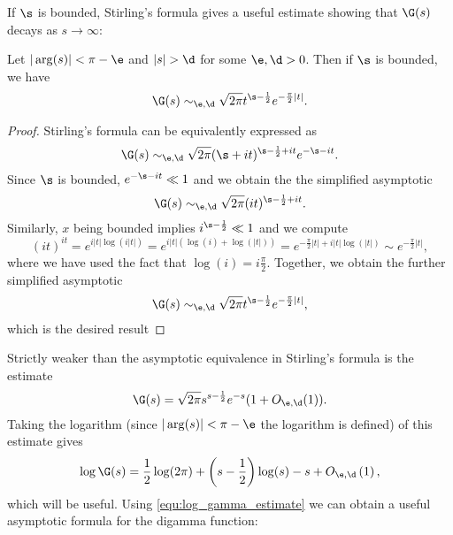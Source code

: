       If $\s$ is bounded, Stirling's formula gives a useful estimate showing that $\G(s)$ decays as $s \to \infty$:
      
      \begin{corollary}\label{equ:weaker_Stirling_formula}
      Let $|\arg(s)| < \pi-\e$ and $|s| > \d$ for some $\e,\d > 0$. Then if $\s$ is bounded, we have
        \[
          \G(s) \sim_{\e,\d} \sqrt{2\pi}t^{\s-\frac{1}{2}}e^{-\frac{\pi}{2}|t|}.
        \]
      \end{corollary}
      \begin{proof}
        Stirling's formula can be equivalently expressed as
        \[
          \G(s) \sim_{\e,\d} \sqrt{2\pi}(\s+it)^{\s-\frac{1}{2}+it}e^{-\s-it}.
        \]
        Since $\s$ is bounded, $e^{-\s-it} \ll 1$ and we obtain the the simplified asymptotic
        \[
          \G(s) \sim_{\e,\d} \sqrt{2\pi}(it)^{\s-\frac{1}{2}+it}.
        \]
        Similarly, $x$ being bounded implies $i^{\s-\frac{1}{2}} \ll 1$ and we compute
        \[
          (it)^{it} = e^{i|t|\log(i|t|)} = e^{i|t|(\log(i)+\log(|t|))} = e^{-\frac{\pi}{2}|t|+i|t|\log(|t|)} \sim e^{-\frac{\pi}{2}|t|},
        \]
        where we have used the fact that $\log(i) = i\frac{\pi}{2}$. Together, we obtain the further simplified asymptotic
        \[
          \G(s) \sim_{\e,\d} \sqrt{2\pi}t^{\s-\frac{1}{2}}e^{-\frac{\pi}{2}|t|},
        \]
        which is the desired result
      \end{proof}
      Strictly weaker than the asymptotic equivalence in Stirling's formula is the estimate
      \begin{equation}
          \G(s) = \sqrt{2\pi}s^{s-\frac{1}{2}}e^{-s}(1+O_{\e,\d}(1)).
      \end{equation}
      Taking the logarithm (since $|\arg(s)| < \pi-\e$ the logarithm is defined) of this estimate gives
      \begin{equation}\label{equ:log_gamma_estimate}
        \log\G(s) = \frac{1}{2}\log(2\pi)+\left(s-\frac{1}{2}\right)\log(s)-s+O_{\e,\d}\left(1\right),
      \end{equation}
      which will be useful. Using \cref{equ:log_gamma_estimate} we can obtain a useful asymptotic formula for the digamma function:

